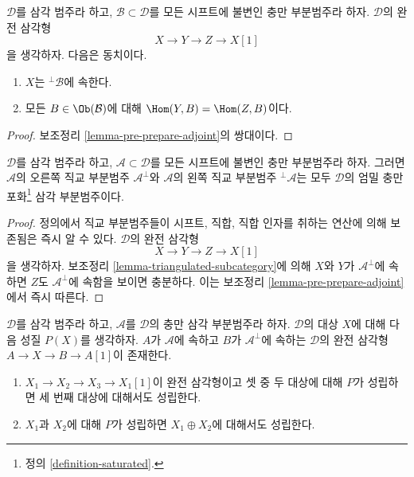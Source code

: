 \begin{lemma}
\label{lemma-pre-prepare-adjoint-dual}
$\mathcal{D}$를 삼각 범주라 하고, $\mathcal{B} \subset \mathcal{D}$를
모든 시프트에 불변인 충만 부분범주라 하자. $\mathcal{D}$의 완전 삼각형
$$
X \to Y \to Z \to X[1]
$$
을 생각하자. 다음은 동치이다.
\begin{enumerate}
\item $X$는 ${}^\perp\mathcal{B}$에 속한다.
\item 모든 $B \in \Ob(\mathcal{B})$에 대해
$\Hom(Y, B) = \Hom(Z, B)$이다.
\end{enumerate}
\end{lemma}

\begin{proof}
보조정리 \ref{lemma-pre-prepare-adjoint}의 쌍대이다.
\end{proof}

\begin{lemma}
\label{lemma-orthogonal-triangulated}
$\mathcal{D}$를 삼각 범주라 하고, $\mathcal{A} \subset \mathcal{D}$를
모든 시프트에 불변인 충만 부분범주라 하자. 그러면 $\mathcal{A}$의
오른쪽 직교 부분범주 $\mathcal{A}^\perp$와 $\mathcal{A}$의 왼쪽
직교 부분범주 ${}^\perp\mathcal{A}$는 모두 $\mathcal{D}$의 엄밀 충만
포화\footnote{정의 \ref{definition-saturated}.} 삼각 부분범주이다.
\end{lemma}

\begin{proof}
정의에서 직교 부분범주들이 시프트, 직합, 직합 인자를 취하는 연산에
의해 보존됨은 즉시 알 수 있다. $\mathcal{D}$의 완전 삼각형
$$
X \to Y \to Z \to X[1]
$$
을 생각하자. 보조정리 \ref{lemma-triangulated-subcategory}에 의해
$X$와 $Y$가 $\mathcal{A}^\perp$에 속하면 $Z$도
$\mathcal{A}^\perp$에 속함을 보이면 충분하다. 이는 보조정리
\ref{lemma-pre-prepare-adjoint}에서 즉시 따른다.
\end{proof}

\begin{lemma}
\label{lemma-prepare-adjoint}
$\mathcal{D}$를 삼각 범주라 하고, $\mathcal{A}$를 $\mathcal{D}$의 충만
삼각 부분범주라 하자. $\mathcal{D}$의 대상 $X$에 대해 다음 성질
$P(X)$를 생각하자. $A$가 $\mathcal{A}$에 속하고 $B$가
$\mathcal{A}^\perp$에 속하는 $\mathcal{D}$의 완전 삼각형
$A \to X \to B \to A[1]$이 존재한다.
\begin{enumerate}
\item $X_1 \to X_2 \to X_3 \to X_1[1]$이 완전 삼각형이고 셋 중
두 대상에 대해 $P$가 성립하면 세 번째 대상에 대해서도 성립한다.
\item $X_1$과 $X_2$에 대해 $P$가 성립하면
$X_1 \oplus X_2$에 대해서도 성립한다.
\end{enumerate}
\end{lemma}

